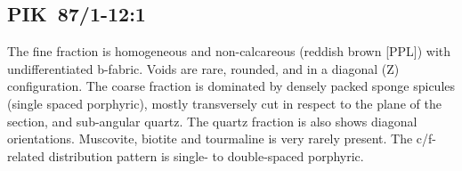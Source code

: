 \documentclass[a4paper]{article}
\begin{document}
\begin{figure}[H]
	\caption{}
	\label{fig:6_pik}
\end{figure}

\newpage\subsection{PIK~87/1-12:1 \citep[pik\#53; Fig.~\ref{fig:pik.pottery}.2; Lusako style;][426 Pl.~45.16]{Seidensticker.2021e}}

\begin{multicols}{2}
\noindent The fine fraction is homogeneous and non-calcareous (reddish brown [PPL]) with undifferentiated b-fabric. Voids are rare, rounded, and in a diagonal (Z) configuration. The coarse fraction is dominated by densely packed sponge spicules (single spaced porphyric), mostly transversely cut in respect to the plane of the section, and sub-angular quartz. The quartz fraction is also shows diagonal orientations. Muscovite, biotite and tourmaline is very rarely present. The c/f-related distribution pattern is single- to double-spaced porphyric.
\end{multicols}
\end{document}
